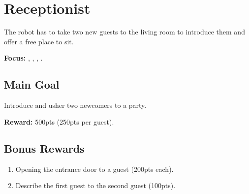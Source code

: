 \section{Receptionist}
\label{test:receptionist}
The robot has to take two new guests to the living room to introduce them and offer a free place to sit.

\noindent \textbf{Focus:} \SysI{}, \HRI{}, \PerDet{}, \PerRec.

\vspace{-5pt} %
\subsection*{Main Goal}
Introduce and usher two newcomers to a party.

\noindent\textbf{Reward:} 500pts (250pts per guest).

\vspace{-5pt}
\subsection*{Bonus Rewards}
\begin{enumerate}[nosep]
	\item Opening the entrance door to a guest (200pts each).
	\item Describe the first guest to the second guest  (100pts).
\end{enumerate}


